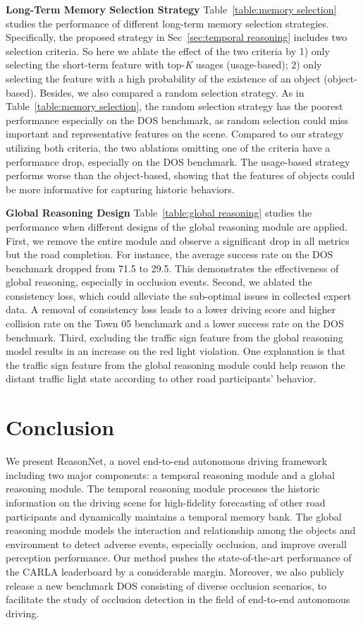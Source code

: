 \documentclass[10pt,twocolumn,letterpaper]{article}
\begin{document}
\noindent\textbf{Long-Term Memory Selection Strategy} Table~\ref{table:memory selection} studies the performance of different long-term memory selection strategies. Specifically, the proposed strategy in Sec~\ref{sec:temporal reasoning} includes two selection criteria. So here we ablate the effect of the two criteria by 1) only selecting the short-term feature with top-\textit{K} usages (usage-based); 2) only selecting the feature with a high probability of the existence of an object (object-based). Besides, we also compared a random selection strategy. As in Table~\ref{table:memory selection}, the random selection strategy has the poorest performance especially on the DOS benchmark, as random selection could miss important and representative features on the scene. Compared to our strategy utilizing both criteria, the two ablations omitting one of the criteria have a performance drop, especially on the DOS benchmark. The usage-based strategy performs worse than the object-based, showing that the features of objects could be more informative for capturing historic behaviors.



\noindent\textbf{Global Reasoning Design} Table~\ref{table:global reasoning} studies the performance when different designs of the global reasoning module are applied. First, we remove the entire module and observe a significant drop in all metrics but the road completion. For instance, the average success rate on the DOS benchmark dropped from 71.5 to 29.5. This demonstrates the effectiveness of global reasoning, especially in occlusion events. Second, we ablated the consistency loss, which could alleviate the sub-optimal issues in collected expert data. A removal of consistency loss leads to a lower driving score and higher collision rate on the Town 05 benchmark and a lower success rate on the DOS benchmark.
Third, excluding the traffic sign feature from the global reasoning model results in an increase on the red light violation. One explanation is that the traffic sign feature from the global reasoning module could help reason the distant traffic light state according to other road participants' behavior. 




\section{Conclusion}
We present ReasonNet, a novel end-to-end autonomous driving framework including two major components: a temporal reasoning module and a global reasoning module. The temporal reasoning module processes the historic information on the driving scene for high-fidelity forecasting of other road participants and dynamically maintains a temporal memory bank. The global reasoning module models the interaction and relationship among the objects and environment to detect adverse events, especially occlusion, and improve overall perception performance. Our method pushes the state-of-the-art performance of the CARLA leaderboard by a considerable margin. Moreover, we also publicly release a new benchmark DOS consisting of diverse occlusion scenarios, to facilitate the study of occlusion detection in the field of end-to-end autonomous driving.
\end{document}
